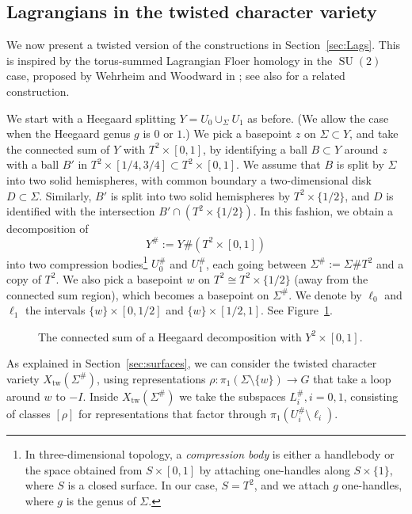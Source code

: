 \documentclass [11pt]{amsart}
\theoremstyle{remark}
\def\su {{\operatorname{SU}(2)}}
\def\Char {X}
\def\Xtw{\Char_{\operatorname{tw}}}
\begin{document}
\subsection{Lagrangians in the twisted character variety}
\label{sec:LagTw}
We now present a twisted version of the constructions in Section~\ref{sec:Lags}. This is inspired by the torus-summed Lagrangian Floer homology in the $\su$ case, proposed by Wehrheim and Woodward in \cite[Definition 4.4.1]{WWFloerField}; see also \cite{Horton} for a related construction.

We start with a Heegaard splitting $Y = U_0 \cup_{\Sigma} U_1$ as before. (We allow the case when the Heegaard genus $g$ is $0$ or $1$.) We pick a basepoint $z$ on $\Sigma \subset Y$, and take the connected sum of $Y$ with $T^2 \times [0,1]$, by identifying a ball $B \subset Y$ around $z$ 
with a ball $B'$ in $T^2 \times [1/4,3/4] \subset T^2 \times [0,1]$. We assume that $B$ is split by $\Sigma$ into two solid hemispheres, with common boundary a two-dimensional disk $D \subset \Sigma$. Similarly, $B'$ is split into two solid hemispheres by $T^2 \times \{1/2\}$, and $D$ is identified with the intersection $B' \cap (T^2 \times \{1/2\})$. In this fashion, we obtain a decomposition of $$Y^{\#} := Y \# (T^2 \times [0,1])$$
into two compression bodies\footnote{In three-dimensional topology, a {\em compression body} is either a handlebody or the space obtained from $S \times [0,1]$ by attaching one-handles along $S \times \{1\}$, where $S$ is a closed surface. In our case, $S=T^2$, and we attach $g$ one-handles, where $g$ is the genus of $\Sigma$.} $U_0^{\#}$ and $U_1^{\#}$, each going between $\Sigma^{\#}:=\Sigma \# T^2$ and a copy of $T^2$. We also pick a basepoint $w$ on $T^2 \cong T^2 \times \{1/2\}$ (away from the connected sum region), which becomes a basepoint on $\Sigma^{\#}$. We denote by $\ell_0$ and $\ell_1$ the intervals $\{w\} \times [0,1/2]$ and $\{w\} \times [1/2, 1]$. See Figure~\ref{fig:twisting}.

\begin {figure}
\begin {center}

\caption {The connected sum of a Heegaard decomposition with $Y^2 \times [0,1]$.}
\label{fig:twisting}
\end {center}
\end {figure}



As explained in Section~\ref{sec:surfaces}, we can consider the twisted character variety $\Xtw(\Sigma^{\#})$, using representations $\rho: \pi_1(\Sigma \setminus \{w\}) \to G$ that take a loop around $w$ to $-I$. Inside $\Xtw(\Sigma^{\#})$ we take the subspaces $L_i^{\#}, i=0,1$, consisting of classes $[\rho]$ for representations that factor through $\pi_1(U^{\#}_i \setminus \ell_i)$. 
 
\end{document}
